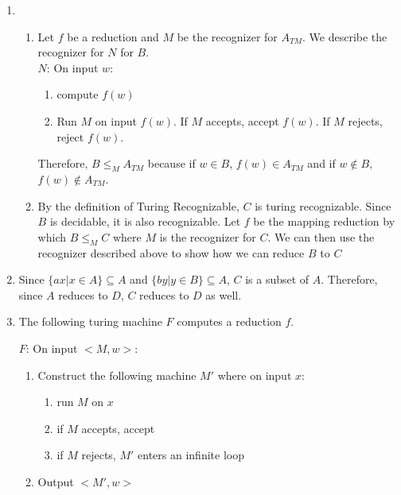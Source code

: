 


\begin{enumerate}
    \item \begin{enumerate}
        \item Let $f$ be a reduction and $M$ be the recognizer for $A_{TM}$. We describe the recognizer for $N$ for $B$. \\

        $N$: On input $w$:
        \begin{enumerate}
            \item compute $f(w)$
            \item Run $M$ on input $f(w)$. If $M$ accepts, accept $f(w)$. If $M$ rejects, reject $f(w)$.
        \end{enumerate}

        Therefore, $B \leq_M A_{TM}$ because if $w \in B$, $f(w) \in A_{TM}$ and if $w \notin B$, $f(w) \notin A_{TM}$.

        \item By the definition of Turing Recognizable, $C$ is turing recognizable. Since $B$ is decidable, it is also recognizable. Let $f$ be the mapping reduction by which $B \leq_M C$ where $M$ is the recognizer for $C$. We can then use the recognizer described above to show how we can reduce $B$ to $C$
    \end{enumerate}

    \item Since $\{ax | x \in A\} \subseteq A$ and $\{by | y \in B\} \subseteq A$, $C$ is a subset of $A$. Therefore, since $A$ reduces to $D$, $C$ reduces to $D$ as well.

    \item The following turing machine $F$ computes a reduction $f$.

    $F$: On input $<M, w>$:
    \begin{enumerate}
        \item Construct the following machine $M'$ where on input $x$:
        \begin{enumerate}
            \item run $M$ on $x$
            \item if $M$ accepts, accept
            \item if $M$ rejects, $M'$ enters an infinite loop
        \end{enumerate}

        \item Output $<M', w>$
    \end{enumerate}


\end{enumerate}
